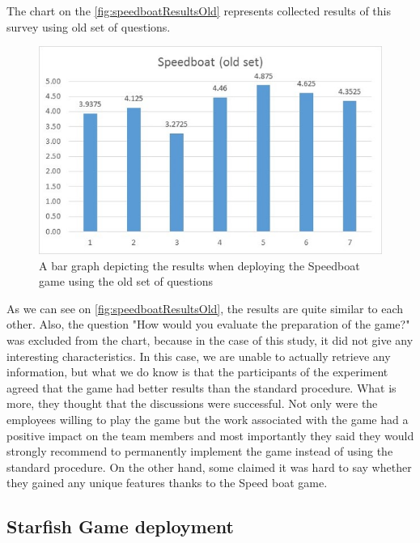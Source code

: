 The chart on the \autoref{fig:speedboatResultsOld} represents collected results of this survey using old set of questions.

\begin{figure}[!htbp]
\caption{A bar graph depicting the results when deploying the Speedboat game using the old set of questions}
\label{fig:speedboatResultsOld}
\centering
\includegraphics[width=1\textwidth]{charts/speedboatOldSet}
\end{figure}

As we can see on \autoref{fig:speedboatResultsOld}, the results are quite similar to each other. Also, the question "How would you evaluate the preparation of the game?" was excluded from the chart, because in the case of this study, it did not give any interesting characteristics. In this case, we are unable to actually retrieve any information, but what we do know is that the participants of the experiment agreed that the game had better results than the standard procedure. What is more, they thought that the discussions were successful. Not only were the employees willing to play the game but the work associated with the game had a positive impact on the team members and most importantly they said they would strongly recommend to permanently implement the game instead of using the standard procedure. On the other hand, some claimed it was hard to say
whether they gained any unique features thanks to the Speed boat game.

\subsection{Starfish Game deployment}

